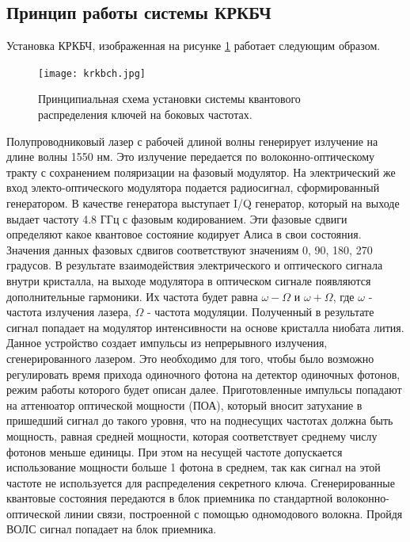 \subsection*{Принцип работы системы КРКБЧ}
Установка КРКБЧ, изображенная на рисунке \ref{fig:krkbch} работает следующим образом. 
\begin{figure}
    \centering
    \texttt{[image: krkbch.jpg]}
    \caption{Принципиальная схема установки системы квантового распределения ключей на боковых частотах.}
    \label{fig:krkbch} 
\end{figure}
Полупроводниковый лазер с рабочей длиной волны генерирует излучение на длине волны 1550 нм. Это излучение передается по волоконно-оптическому тракту с сохранением поляризации на фазовый модулятор.
На электрический же вход электо-оптического модулятора подается радиосигнал, сформированный генератором. В качестве генератора выступает I/Q генератор, который на выходе выдает частоту 4.8 ГГц с фазовым кодированием.
Эти фазовые сдвиги определяют какое квантовое состояние кодирует Алиса в свои состояния. Значения данных фазовых сдвигов соответствуют значениям {0, 90, 180, 270} градусов. 
В результате взаимодействия электрического и оптического сигнала внутри кристалла, на выходе модулятора в оптическом сигнале появляются дополнительные гармоники. Их частота будет равна $\omega - \Omega$ и $\omega + \Omega$, где $\omega$ - частота излучения лазера, $\Omega$ - частота модуляции.
Полученный в результате сигнал попадает на модулятор интенсивности на основе кристалла ниобата лития. Данное устройство создает импульсы из непрерывного излучения, сгенерированного лазером. Это необходимо для того, чтобы было возможно регулировать время прихода одиночного фотона на детектор одиночных фотонов, режим работы которого будет описан далее.
Приготовленные импульсы попадают на аттенюатор оптической мощности (ПОА), который вносит затухание в пришедший сигнал до такого уровня, что на поднесущих частотах должна быть мощность, равная средней мощности, которая соответствует среднему числу фотонов меньше единицы.
При этом на несущей частоте допускается использование мощности больше 1 фотона в среднем, так как сигнал на этой частоте не используется для распределения секретного ключа.
Сгенерированные квантовые состояния передаются в блок приемника по стандартной волоконно-оптической линии связи, построенной с помощью одномодового волокна. 
Пройдя ВОЛС сигнал попадает на блок приемника. 
